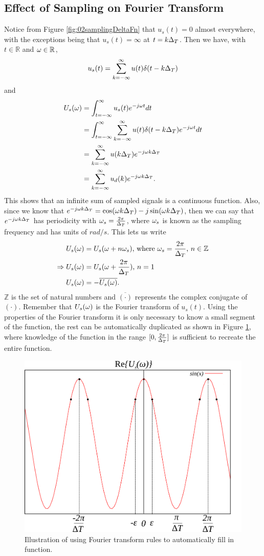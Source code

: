 \subsection{Effect of Sampling on Fourier Transform}
Notice from Figure \ref{fig:02samplingDeltaFn} that $u_s(t) = 0$ almost everywhere, with the exceptions being that $u_s(t) = \infty$ at $t=k\Delta_T$. Then we have, with $t\in\mathbb{R}$ and $\omega\in\mathbb{R}$,
$$u_s(t) = \sum_{k=-\infty}^\infty u(t)\delta(t-k\Delta_T)$$
and
\begin{align*}
U_s(\omega) &= \int_{t=-\infty}^\infty u_s(t)e^{-j\omega t} dt \\
&= \int_{t=-\infty}^\infty \sum_{k=-\infty}^\infty u(t)\delta(t-k\Delta_T)e^{-j\omega t} dt \\
&= \sum_{k=-\infty}^\infty u(k\Delta_T) e^{-j\omega k\Delta_T} \\
&= \sum_{k=-\infty}^\infty u_d(k) e^{-j\omega k\Delta_T}.
\end{align*}
This shows that an infinite sum of sampled signals is a continuous function. Also, since we know that $e^{-j\omega k\Delta_T} = \cos(\omega k\Delta_T) - j\sin(\omega k\Delta_T)$, then we can say that $e^{-j\omega k\Delta_T}$ has periodicity with $\omega_s = \frac{2\pi}{\Delta_T}$, where $\omega_s$ is known as the sampling frequency and has units of $rad/s$. This lets us write
\begin{align*}
U_s(\omega) &= U_s(\omega+n\omega_s) \text{, where } \omega_s = \frac{2\pi}{\Delta_T} \text{, } n\in\mathbb{Z} \\
\Rightarrow U_s(\omega) &= U_s(\omega+\frac{2\pi}{\Delta_T}) \text{, } n=1 \\
U_s(\omega) &= -\overline{U_s(\omega)}.
\end{align*}
$\mathbb{Z}$ is the set of natural numbers and $\overline{(\cdot)}$ represents the complex conjugate of $(\cdot)$. Remember that $U_s(\omega)$ is the Fourier transform of $u_s(t)$. Using the properties of the Fourier transform it is only necessary to know a small segment of the function, the rest can be automatically duplicated as shown in Figure \ref{fig:02sin}, where knowledge of the function in the range $[0,\frac{2\pi}{\Delta_T}]$ is sufficient to recreate the entire function.
\begin{figure}[ht!]
	\centering
	\includegraphics[width=.5\textwidth]{images/02sin}
	\caption{Illustration of using Fourier transform rules to automatically fill in function.}
	\label{fig:02sin}
\end{figure}

